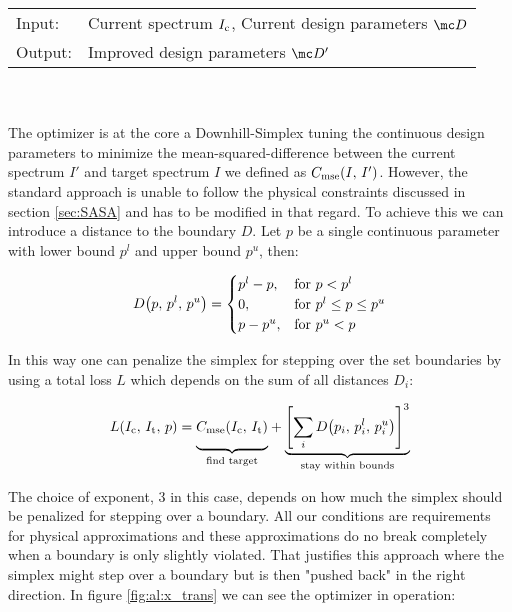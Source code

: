 \begin{tabular}{ll}
    \toprule
    Input: &
    Current spectrum $I_{\mathrm{c}}$, 
    Current design parameters $\mc D$\\
    Output: & 
    Improved design parameters $\mc D'$\\
    \bottomrule
\end{tabular}
\\
\\
The optimizer is at the core a Downhill-Simplex \cite{Nelder1965} tuning the continuous design parameters to minimize the mean-squared-difference between the current spectrum $I'$ and target spectrum $I$ we defined as 
$C_{\mathrm{mse}}\qty(I, \, I')$.
However, the standard approach is unable to follow the physical constraints discussed in section \ref{sec:SASA} and has to be modified in that regard. To achieve this we can introduce a distance to the boundary $D$. Let $p$ be a single continuous parameter with lower bound $p^l$ and upper bound $p^u$, then:

\begin{equation}
    D\qty(p, \, p^l, \, p^u) =
    \begin{cases}
        p^l - p, & \text{for } p < p^l\\
        0, & \text{for } p^l \leq p \leq p^u\\
        p - p^u, & \text{for } p^u < p
    \end{cases}
\end{equation}

\noindent
In this way one can penalize the simplex for stepping over the set boundaries by using a total loss $L$ which depends on the sum of all distances $D_i$:

\begin{equation}
    L(I_\s{c}, \,I_\s{t}, \,p) =
    {\underbrace{%
    \vphantom{ \left(\frac{a^{0.3}}{b}\right) }
    C_\s{mse}(I_\s{c}, \, I_\s{t})}_{\text{find target}}}
    +
    {\underbrace{%
    \qty[\sum_i D\qty(p_i, \, p_i^l, \, p_i^u)]^3
    }_{\text{stay within bounds}}}\\
\end{equation}

The choice of exponent, 3 in this case, depends on how much the simplex should be penalized for stepping over a boundary. All our conditions are requirements for physical approximations and these approximations do no break completely when a boundary is only slightly violated. That justifies this approach where the simplex might step over a boundary but is then "pushed back" in the right direction. In figure \ref{fig:al:x_trans} we can see the optimizer in operation:

